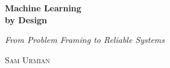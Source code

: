 \begin{titlepage}
\centering

\vspace*{0.18\textheight}

{%
  \fontsize{24}{30}\selectfont\bfseries\sffamily
  Machine Learning\\[4pt]by Design\par
}

\vspace{1.2em}

{\large\itshape From Problem Framing to Reliable Systems\par}

\vspace{3.5em}

{\Large\scshape Sam Urmian\par}

\vfill


\end{titlepage}
\clearpage

